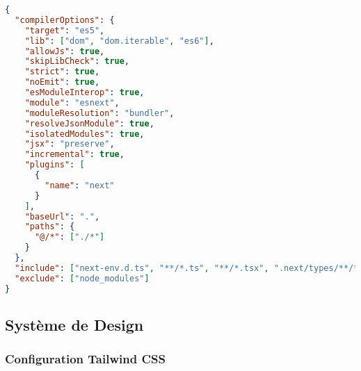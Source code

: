 \begin{lstlisting}[language=JSON, caption=Configuration TypeScript (tsconfig.json)]
{
  "compilerOptions": {
    "target": "es5",
    "lib": ["dom", "dom.iterable", "es6"],
    "allowJs": true,
    "skipLibCheck": true,
    "strict": true,
    "noEmit": true,
    "esModuleInterop": true,
    "module": "esnext",
    "moduleResolution": "bundler",
    "resolveJsonModule": true,
    "isolatedModules": true,
    "jsx": "preserve",
    "incremental": true,
    "plugins": [
      {
        "name": "next"
      }
    ],
    "baseUrl": ".",
    "paths": {
      "@/*": ["./*"]
    }
  },
  "include": ["next-env.d.ts", "**/*.ts", "**/*.tsx", ".next/types/**/*.ts"],
  "exclude": ["node_modules"]
}
\end{lstlisting}

\subsection{Système de Design}

\subsubsection{Configuration Tailwind CSS}

